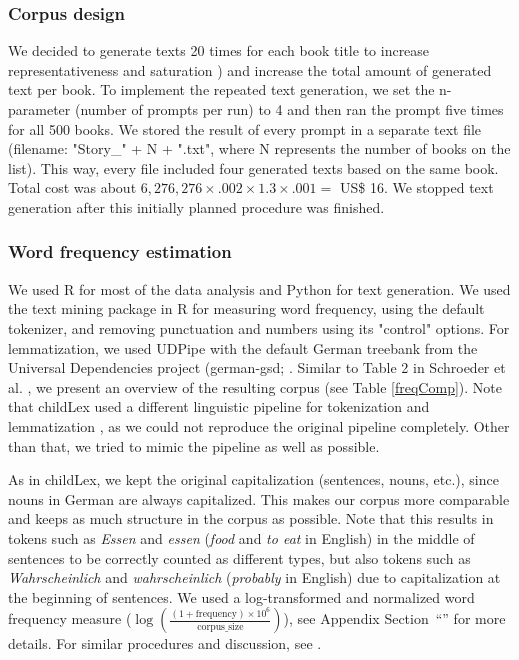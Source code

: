 \documentclass[doc, a4paper, anonymous]{apa7}
\begin{document}
\subsubsection*{Corpus design}

We decided to generate texts 20 times for each book title to increase representativeness and saturation  \citep[see ][]{schnell_understanding_2021}) and increase the total amount of generated text per book. To implement the repeated text generation, we set the n-parameter (number of prompts per run) to 4 and then ran the prompt five times for all 500 books. We stored the result of every prompt in a separate text file (filename: "Story\_" + N + ".txt", where N represents the number of books on the list). This way, every file included four generated texts based on the same book. Total cost was about $6,276,276 \times .002 \times 1.3 \times .001 =$ US\$ 16. We stopped text generation after this initially planned procedure was finished. 


\subsubsection*{Word frequency estimation}

We used R for most of the data analysis and Python for text generation. We used the text mining package in R \citep[tm; ][]{feinerer_text_2008} for measuring word frequency, using the default tokenizer, and removing punctuation and numbers using its "control" options. For lemmatization, we used UDPipe \citep{straka_tokenizing_2017} with the default German treebank from the Universal Dependencies project (german-gsd; \citep{mcdonald_universal_2013}. Similar to Table 2 in Schroeder et al. \citep{schroeder_childlex_2015}, we present an overview of the resulting corpus (see Table \ref{freqComp}). Note that childLex used a different linguistic pipeline for tokenization and lemmatization \citep[i.e., based on][]{jurish_word_2013, yli-jyra_tagh_2006}, as we could not reproduce the original pipeline completely. Other than that, we tried to mimic the pipeline as well as possible. 

As in childLex, we kept the original capitalization (sentences, nouns, etc.), since nouns in German are always capitalized. This makes our corpus more comparable and keeps as much structure in the corpus as possible. Note that this results in tokens such as \textit{Essen} and \textit{essen} (\textit{food} and \textit{to eat} in English) in the middle of sentences to be correctly counted as different types, but also tokens such as \textit{Wahrscheinlich} and \textit{wahrscheinlich} (\textit{probably} in English) due to capitalization at the beginning of sentences. 
We used a log-transformed and normalized word frequency measure ($\log\left(\frac{(1 + \text{frequency}) \times 10^6}{\text{corpus\_size}}\right)$), see Appendix Section~“” for more details. For similar procedures and discussion, see \citet{heister_dlexdb_2011, van_heuven_subtlex-uk_2014}.
\end{document}
